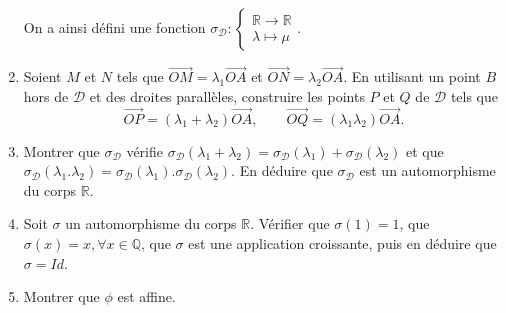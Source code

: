 \documentclass[a4paper,12pt,reqno]{amsart}
\begin{document}
\begin{exo}
\begin{enumerate}
    On a ainsi défini une fonction
      $
        \sigma_{\mathcal{D}} :
        \begin{cases}
          \mathbb{R}\rightarrow\mathbb{R}\\
          \lambda\mapsto\mu
        \end{cases}
      $.\vspace{1mm}

    \item Soient $M$ et $N$ tels que $\overrightarrow{OM}=\lambda_{1}\overrightarrow{OA}$ et $\overrightarrow{ON}=\lambda_{2}\overrightarrow{OA}$. En utilisant un point $B$ hors de $\mathcal{D}$ et des droites parallèles, construire les points $P$ et $Q$ de $\mathcal{D}$ tels que
      \[
        \overrightarrow{OP}=(\lambda_{1}+\lambda_{2})\overrightarrow{OA},\qquad
        \overrightarrow{OQ}=(\lambda_{1}\lambda_{2})\overrightarrow{OA}.
      \]

    \item Montrer que $\sigma_{\mathcal{D}}$ vérifie $\sigma_{\mathcal{D}}(\lambda_{1}+\lambda_{2})=\sigma_{\mathcal{D}}(\lambda_{1})+\sigma_{\mathcal{D}}(\lambda_{2})$ et que $\sigma_{\mathcal{D}}(\lambda_{1}.\lambda_{2})=\sigma_{\mathcal{D}}(\lambda_{1}).\sigma_{\mathcal{D}}(\lambda_{2})$. En déduire que $\sigma_{\mathcal{D}}$ est un automorphisme du corps $\mathbb{R}$.

    \item Soit $\sigma$ un automorphisme du corps $\mathbb{R}$. Vérifier que $\sigma(1)=1$, que $\sigma(x)=x, \forall x\in\mathbb{Q}$, que $\sigma$ est une application croissante, puis en déduire que $\sigma=Id$.

    \item Montrer que $\phi$ est affine.
  \end{enumerate}
\end{exo}
\end{document}
